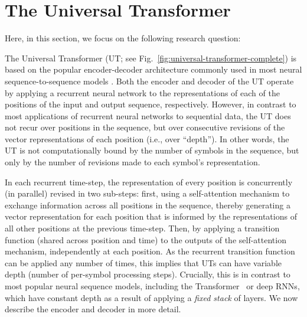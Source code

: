 \section{The Universal Transformer }%

Here, in this section, we focus on the following research question:

The Universal Transformer (UT; see Fig.~\ref{fig:universal-transformer-complete}) is based on the popular encoder-decoder architecture commonly used in most neural sequence-to-sequence models \citep{sutskever14,cho2014learning,transformer}. Both the encoder and decoder of the UT operate by applying a recurrent neural network to the representations of each of the positions of the input and output sequence, respectively. However, in contrast to most applications of recurrent neural networks to sequential data, the UT does not recur over positions in the sequence, but over consecutive revisions of the vector representations of each position (i.e., over ``depth''). In other words, the UT is not computationally bound by the number of symbols in the sequence, but only by the number of revisions made to each symbol's representation.

In each recurrent time-step, the representation of every position is concurrently (in parallel) revised in two sub-steps: first, using a self-attention mechanism to exchange information across all positions in the sequence, thereby generating a vector representation for each position that is informed by the representations of all other positions at the previous time-step. Then, by applying a transition function (shared across position and time) to the outputs of the self-attention mechanism, independently at each position. As the recurrent transition function can be applied any number of times, this implies that UTs can have variable depth (number of per-symbol processing steps). Crucially, this is in contrast to most popular neural sequence models, including the Transformer~\citep{transformer} or deep RNNs, which have constant depth as a result of applying a \emph{fixed stack} of layers. We now describe the encoder and decoder in more detail.

